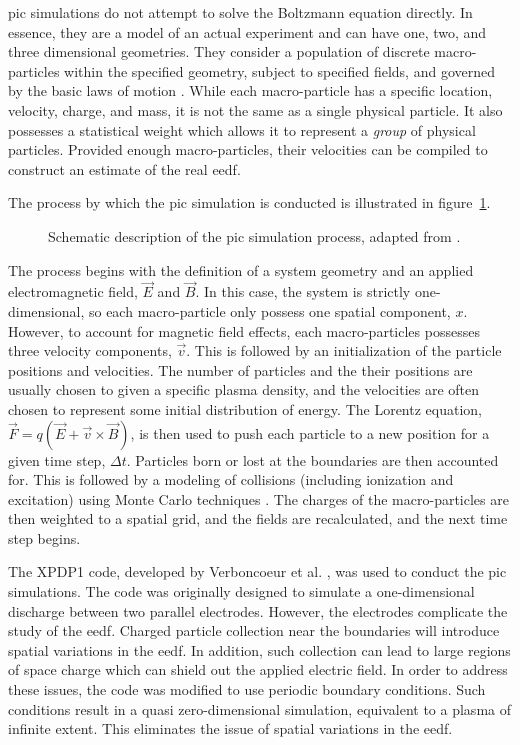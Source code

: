 \acs{pic} simulations do not attempt to solve the Boltzmann equation directly.
In essence, they are a model of an actual experiment and can have one, two, and
three dimensional geometries. They consider a population of discrete
macro-particles within the specified geometry, subject to specified fields, and
governed by the basic laws of motion \cite{Birdsall1991}. While each
macro-particle has a specific location, velocity, charge, and mass, it is not
the same as a single physical particle. It also possesses a statistical weight
which allows it to represent a \emph{group} of physical particles. Provided
enough macro-particles, their velocities can be compiled to construct an
estimate of the real \acs{eedf}.

The process by which the \acs{pic} simulation is conducted is illustrated in
figure~\ref{fig:pic}.
\begin{figure}
  \centering
  
  \caption{Schematic description of the \acs{pic} simulation process, adapted
    from \cite{Birdsall1991}.}
  \label{fig:pic}
\end{figure}
The process begins with the definition of a system geometry and an applied
electromagnetic field, $\vec{E}$ and $\vec{B}$. In this case, the system is
strictly one-dimensional, so each macro-particle only possess one spatial
component, $x$. However, to account for magnetic field effects, each
macro-particles possesses three velocity components, $\vec{v}$. This is followed
by an initialization of the particle positions and velocities. The number of
particles and the their positions are usually chosen to given a specific plasma
density, and the velocities are often chosen to represent some initial
distribution of energy. The Lorentz equation, $\vec{F} = q(\vec{E} +
\vec{v}\times\vec{B})$, is then used to push each particle to a new position for
a given time step, $\Delta t$. Particles born or lost at the boundaries are then
accounted for. This is followed by a modeling of collisions (including
ionization and excitation) using Monte Carlo techniques \cite{Birdsall1991}. The
charges of the macro-particles are then weighted to a spatial grid, and the
fields are recalculated, and the next time step begins.

The XPDP1 code, developed by Verboncoeur et al. \cite{Verboncoeur1993}, was used
to conduct the \acs{pic} simulations. The code was originally designed to
simulate a one-dimensional discharge between two parallel electrodes. However,
the electrodes complicate the study of the \acs{eedf}. Charged particle
collection near the boundaries will introduce spatial variations in the
\acs{eedf}. In addition, such collection can lead to large regions of space
charge which can shield out the applied electric field. In order to address
these issues, the code was modified to use periodic boundary conditions. Such
conditions result in a quasi zero-dimensional simulation, equivalent to a plasma
of infinite extent. This eliminates the issue of spatial variations in the
\acs{eedf}.

